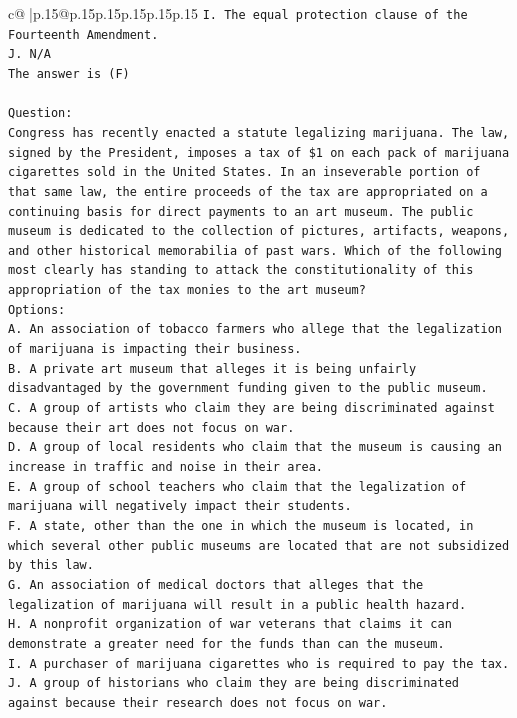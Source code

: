 \documentclass{article}
\begin{document}
{\begin{supertabular}{c@{$\;$}|p{.15\linewidth}@{}p{.15\linewidth}p{.15\linewidth}p{.15\linewidth}p{.15\linewidth}p{.15\linewidth}}
{{{\texttt{I. The equal protection clause of the Fourteenth Amendment.} \\
\texttt{J. N/A} \\
\texttt{The answer is (F)} \\
\\ 
\texttt{Question:} \\
\texttt{Congress has recently enacted a statute legalizing marijuana. The law, signed by the President, imposes a tax of \$1 on each pack of marijuana cigarettes sold in the United States. In an inseverable portion of that same law, the entire proceeds of the tax are appropriated on a continuing basis for direct payments to an art museum. The public museum is dedicated to the collection of pictures, artifacts, weapons, and other historical memorabilia of past wars. Which of the following most clearly has standing to attack the constitutionality of this appropriation of the tax monies to the art museum?} \\
\texttt{Options:} \\
\texttt{A. An association of tobacco farmers who allege that the legalization of marijuana is impacting their business.} \\
\texttt{B. A private art museum that alleges it is being unfairly disadvantaged by the government funding given to the public museum.} \\
\texttt{C. A group of artists who claim they are being discriminated against because their art does not focus on war.} \\
\texttt{D. A group of local residents who claim that the museum is causing an increase in traffic and noise in their area.} \\
\texttt{E. A group of school teachers who claim that the legalization of marijuana will negatively impact their students.} \\
\texttt{F. A state, other than the one in which the museum is located, in which several other public museums are located that are not subsidized by this law.} \\
\texttt{G. An association of medical doctors that alleges that the legalization of marijuana will result in a public health hazard.} \\
\texttt{H. A nonprofit organization of war veterans that claims it can demonstrate a greater need for the funds than can the museum.} \\
\texttt{I. A purchaser of marijuana cigarettes who is required to pay the tax.} \\
\texttt{J. A group of historians who claim they are being discriminated against because their research does not focus on war.} \\
            }
        }
    }
     \\ \\


\end{supertabular}}
\end{document}
